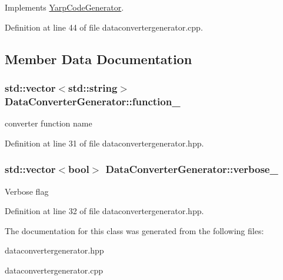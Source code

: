 Implements \hyperlink{classYarpCodeGenerator_ad4247b4dad2a694c3799d5a6968faa41}{Yarp\-Code\-Generator}.



Definition at line 44 of file dataconvertergenerator.\-cpp.



\subsection{Member Data Documentation}
\hypertarget{classDataConverterGenerator_a44c9695737d8f682c98f7310351dd74e}{
\subsubsection[{function\-\_\-}]{\setlength{\rightskip}{0pt plus 5cm}std\-::vector$<$std\-::string$>$ Data\-Converter\-Generator\-::function\-\_\-\hspace{0.3cm}{\ttfamily [private]}}}\label{classDataConverterGenerator_a44c9695737d8f682c98f7310351dd74e}
converter function name 

Definition at line 31 of file dataconvertergenerator.\-hpp.

\hypertarget{classDataConverterGenerator_aad0f91e34facb40b7540ab39a0f974bd}{
\subsubsection[{verbose\-\_\-}]{\setlength{\rightskip}{0pt plus 5cm}std\-::vector$<$bool$>$ Data\-Converter\-Generator\-::verbose\-\_\-\hspace{0.3cm}{\ttfamily [private]}}}\label{classDataConverterGenerator_aad0f91e34facb40b7540ab39a0f974bd}
Verbose flag 

Definition at line 32 of file dataconvertergenerator.\-hpp.



The documentation for this class was generated from the following files\-:\begin{DoxyCompactItemize}
\item 
dataconvertergenerator.\-hpp\item 
dataconvertergenerator.\-cpp\end{DoxyCompactItemize}
